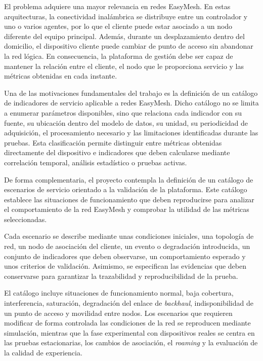 El problema adquiere una mayor relevancia en redes EasyMesh. En estas arquitecturas, 
la conectividad inalámbrica se distribuye entre un controlador y uno o varios agentes, 
por lo que el cliente puede estar asociado a un nodo diferente del equipo principal. 
Además, durante un desplazamiento dentro del domicilio, el dispositivo cliente puede cambiar 
de punto de acceso sin abandonar la red lógica. En consecuencia, la plataforma de gestión debe ser 
capaz de mantener la relación entre el cliente, el nodo que le proporciona servicio y 
las métricas obtenidas en cada instante.

Una de las motivaciones fundamentales del trabajo es la definición de un catálogo de indicadores 
de servicio aplicable a redes EasyMesh. Dicho catálogo no se limita a enumerar parámetros disponibles, 
sino que relaciona cada indicador con su fuente, su ubicación dentro del modelo de datos, su unidad, 
su periodicidad de adquisición, el procesamiento necesario y las limitaciones identificadas durante las pruebas. 
Esta clasificación permite distinguir entre métricas obtenidas directamente del dispositivo 
e indicadores que deben calcularse mediante correlación temporal, análisis estadístico o pruebas activas.

De forma complementaria, el proyecto contempla la definición de un
catálogo de escenarios de servicio orientado a la validación de la
plataforma. Este catálogo establece las situaciones de funcionamiento que
deben reproducirse para analizar el comportamiento de la red EasyMesh y
comprobar la utilidad de las métricas seleccionadas.

Cada escenario se describe mediante unas condiciones iniciales, una
topología de red, un nodo de asociación del cliente, un evento o
degradación introducida, un conjunto de indicadores que deben observarse,
un comportamiento esperado y unos criterios de validación. Asimismo, se
especifican las evidencias que deben conservarse para garantizar la
trazabilidad y reproducibilidad de la prueba.

El catálogo incluye situaciones de funcionamiento normal, baja cobertura,
interferencia, saturación, degradación del enlace de
\textit{backhaul}, indisponibilidad de un punto de acceso y movilidad
entre nodos. Los escenarios que requieren modificar de forma controlada
las condiciones de la red se reproducen mediante simulación, mientras
que la fase experimental con dispositivos reales se centra en las
pruebas estacionarias, los cambios de asociación, el
\textit{roaming} y la evaluación de la calidad de experiencia.

